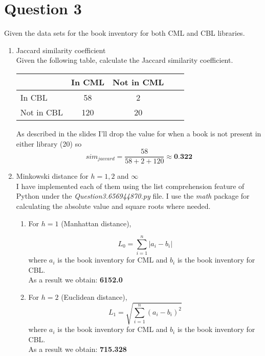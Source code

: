 \documentclass[11pt]{article}
\begin{document}
\section*{Question 3}
Given the data sets for the book inventory for both CML and CBL libraries.\\

\begin{enumerate}[label=(\alph*)]
\item Jaccard similarity coefficient\\

Given the following table, calculate the Jaccard similarity coefficient. \\

\begin{center}
\begin{tabular}{l*{3}{c}r}
                                 & In CML & Not in CML \\
\hline
In CBL                      &        58 &                 2  \\
Not in CBL               &      120 &                20 \\
\bottomrule
\end{tabular}
\end{center}

As described in the slides I'll drop the value for when a book is not present in either library (20) so
\[ sim_{jaccard} = \frac{58}{58 + 2 + 120} \approx \textbf{0.322} \]

\item Minkowski distance for $h = 1, 2$ and $\infty$\\
I have implemented each of them using the list comprehension feature of Python under the \textit{Question3.656944870.py} file. I use the \textit{math} package for calculating the absolute value and square roots where needed. 

\begin{enumerate}[label=\roman*.]
\item For $h = 1$ (Manhattan distance),

\[ L_0 = \sum ^n_{i=1}|a_i - b_i|  \]
where $a_i$ is the book inventory for CML and $b_i$ is the book inventory for CBL.\\
As a result we obtain: \textbf{6152.0}

\item For $h = 2$ (Euclidean distance),
\[ L_1 = \sqrt{\sum ^n_{i=1}(a_i - b_i)^2}  \]
where $a_i$ is the book inventory for CML and $b_i$ is the book inventory for CBL.\\
As a result we obtain: \textbf{715.328}


\end{enumerate}
\end{enumerate}
\end{document}
